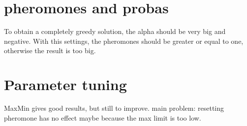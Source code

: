 \documentclass{article}
\begin{document}
\section{pheromones and probas}

To obtain a completely greedy solution, the alpha should be very big and negative.
With this settings, the pheromones should be greater or equal to one, otherwise the result is too big.

\section{Parameter tuning}

MaxMin gives good results, but still to improve.
main problem: resetting pheromone has no effect maybe because the max limit is too low.
\end{document}
